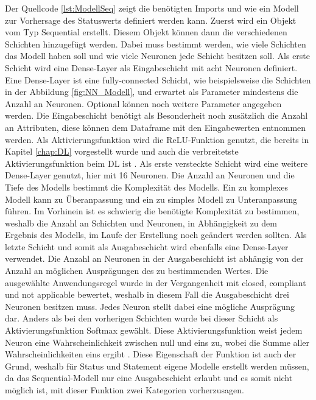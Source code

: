 Der Quellcode \ref{lst:ModellSeq} zeigt die benötigten Imports und wie ein Modell zur Vorhersage des Statuswerts definiert werden kann. Zuerst wird ein Objekt vom Typ Sequential erstellt. Diesem Objekt 
können dann die verschiedenen Schichten hinzugefügt werden. Dabei muss bestimmt werden, wie viele Schichten das Modell haben soll und wie viele Neuronen jede Schicht besitzen soll.
Als erste Schicht wird eine Dense-Layer als Eingabeschicht mit acht Neuronen definiert. Eine Dense-Layer ist eine fully-connected Schicht,
wie beispielsweise die Schichten in der Abbildung \ref{fig:NN_Modell}, und erwartet als Parameter mindestens die Anzahl an Neuronen. Optional können noch weitere Parameter angegeben werden.
Die Eingabeschicht benötigt als Besonderheit noch zusätzlich die Anzahl an Attributen, diese können dem Dataframe mit den Eingabewerten entnommen werden. Als Aktivierungsfunktion wird
die \ac{ReLU}-Funktion genutzt, die bereits in Kapitel \ref{chap:DL} vorgestellt wurde und auch die verbreitetste Aktivierungsfunktion beim \ac{DL} ist \cite[vgl. S.102]{DL_PY}. 
Als erste versteckte Schicht wird eine weitere Dense-Layer genutzt, hier mit 16 Neuronen. 
Die Anzahl an Neuronen und die Tiefe des Modells bestimmt die Komplexität des Modells. Ein zu komplexes Modell kann zu Überanpassung und ein zu simples Modell zu Unteranpassung führen.
Im Vorhinein ist es schwierig die benötigte Komplexität zu bestimmen, weshalb die Anzahl an Schichten und Neuronen, in Abhängigkeit zu dem Ergebnis des Modells, im Laufe der Erstellung noch geändert 
werden sollten. Als letzte Schicht und somit als Ausgabeschicht wird ebenfalls eine Dense-Layer verwendet. Die Anzahl an Neuronen in der Ausgabeschicht ist abhängig von der Anzahl an 
möglichen Ausprägungen des zu bestimmenden Wertes. Die ausgewählte Anwendungsregel wurde in der Vergangenheit mit \glqq closed\grqq{}, \glqq compliant\grqq{} und \glqq not applicable\grqq{} bewertet,
weshalb in diesem Fall die Ausgabeschicht drei Neuronen besitzen muss. Jedes Neuron stellt dabei eine mögliche Ausprägung dar. Anders als bei den vorherigen Schichten wurde bei dieser Schicht 
als Aktivierungsfunktion \glqq Softmax\grqq{} gewählt. Diese Aktivierungsfunktion weist jedem Neuron eine Wahrscheinlichkeit zwischen null und eins zu, wobei die Summe aller Wahrscheinlichkeiten 
eins ergibt \cite{KerasDoc}. Diese Eigenschaft der Funktion ist auch der Grund, weshalb für Status und Statement eigene Modelle erstellt werden müssen, da das Sequential-Modell nur eine Ausgabeschicht
erlaubt und es somit nicht möglich ist, mit dieser Funktion zwei Kategorien vorherzusagen. 

